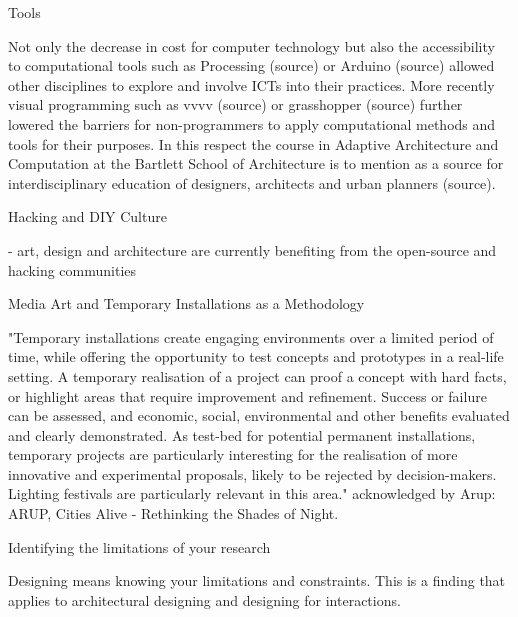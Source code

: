 
Tools

Not only the decrease in cost for computer technology but also the accessibility to computational tools such as Processing (source) or Arduino (source) allowed other disciplines to explore and involve ICTs into their practices. More recently visual programming such as vvvv (source) or grasshopper (source) further lowered the barriers for non-programmers to apply computational methods and tools for their purposes. In this respect the course in Adaptive Architecture and Computation at the Bartlett School of Architecture is to mention as a source for interdisciplinary education of designers, architects and urban planners (source).   


Hacking and DIY Culture

- art, design and architecture are currently benefiting from the open-source and hacking communities 

Media Art and Temporary Installations as a Methodology 

"Temporary installations create engaging environments over a limited period
of time, while offering the opportunity to test concepts and prototypes in a
real-life setting. A temporary realisation of a project can proof a concept with
hard facts, or highlight areas that require improvement and refinement. Success
or failure can be assessed, and economic, social, environmental and other
benefits evaluated and clearly demonstrated. As test-bed for potential permanent
installations, temporary projects are particularly interesting for the realisation of
more innovative and experimental proposals, likely to be rejected by decision-makers. Lighting festivals are particularly relevant in this area."
acknowledged by Arup: ARUP, Cities Alive - Rethinking the Shades of Night. 


Identifying the limitations of your research

Designing means knowing your limitations and constraints. This is a finding that applies to architectural designing and designing for interactions.


